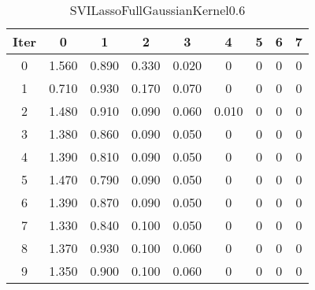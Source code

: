 \begin{table}
	\begin{center}
		\begin{tabular}{|c|c|c|c|c|c|c|c|c|}
			\hline
			Iter & 0 & 1 & 2 & 3 & 4 & 5 & 6 & 7 \\
			\hline
			0 & 1.560 & 0.890 & 0.330 & 0.020 & 0 & 0 & 0 & 0 \\
			\hline
			1 & 0.710 & 0.930 & 0.170 & 0.070 & 0 & 0 & 0 & 0 \\
			\hline
			2 & 1.480 & 0.910 & 0.090 & 0.060 & 0.010 & 0 & 0 & 0 \\
			\hline
			3 & 1.380 & 0.860 & 0.090 & 0.050 & 0 & 0 & 0 & 0 \\
			\hline
			4 & 1.390 & 0.810 & 0.090 & 0.050 & 0 & 0 & 0 & 0 \\
			\hline
			5 & 1.470 & 0.790 & 0.090 & 0.050 & 0 & 0 & 0 & 0 \\
			\hline
			6 & 1.390 & 0.870 & 0.090 & 0.050 & 0 & 0 & 0 & 0 \\
			\hline
			7 & 1.330 & 0.840 & 0.100 & 0.050 & 0 & 0 & 0 & 0 \\
			\hline
			8 & 1.370 & 0.930 & 0.100 & 0.060 & 0 & 0 & 0 & 0 \\
			\hline
			9 & 1.350 & 0.900 & 0.100 & 0.060 & 0 & 0 & 0 & 0 \\
			\hline
		\end{tabular}
	\end{center}
	\caption{SVILassoFullGaussianKernel0.6}
\end{table}